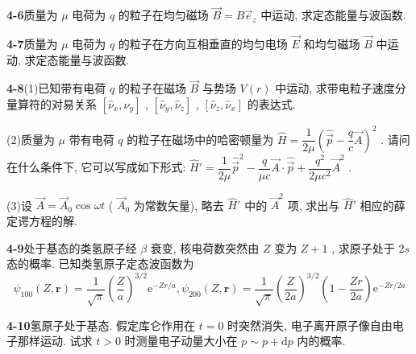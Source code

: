 \vfill

\newpage

\textbf{4-6}\quad 质量为 $\displaystyle \mu$ 电荷为 $\displaystyle q$ 的粒子在均匀磁场 $\displaystyle \vec{B} = B\vec{e}_z$ 中运动, 求定态能量与波函数.

\vfill

\newpage

\textbf{4-7}\quad 质量为 $\displaystyle \mu$ 电荷为 $\displaystyle q$ 的粒子在方向互相垂直的均匀电场 $\displaystyle \vec{E}$ 和均匀磁场 $\displaystyle \vec{B}$ 中运动, 求定态能量与波函数.

\vfill

\newpage

\textbf{4-8}\quad (1)已知带有电荷 $\displaystyle q$ 的粒子在磁场 $\displaystyle \vec{B}$ 与势场 $\displaystyle V(r)$ 中运动, 求带电粒子速度分量算符的对易关系 $\displaystyle [\hat{\nu}_x, \hat{\nu}_y]$ , $\displaystyle [\hat{\nu}_y, \hat{\nu}_z]$ , $\displaystyle [\hat{\nu}_z, \hat{\nu}_x]$ 的表达式.

(2)质量为 $\displaystyle \mu$ 带有电荷 $\displaystyle q$ 的粒子在磁场中的哈密顿量为 $\displaystyle \hat{H} = \dfrac{1}{2\mu}\left(\hat{\vec{p}} - \dfrac{q}{c} \vec{A}\right)^2$ . 请问在什么条件下, 它可以写成如下形式: $\displaystyle \hat{H}' = \dfrac{1}{2\mu}\hat{\vec{p}}^2 - \dfrac{q}{\mu c} \vec{A} \cdot \hat{\vec{p}} + \dfrac{q^2}{2\mu c^2} \vec{A}^{2}$ .

(3)设 $\displaystyle \vec{A} = \vec{A}_0 \cos \omega t$ ( $\displaystyle \vec{A}_0$ 为常数矢量), 略去 $\displaystyle \hat{H}'$ 中的 $\displaystyle \vec{A}^{2}$ 项, 求出与 $\displaystyle \hat{H}'$ 相应的薛定谔方程的解.

\vfill

\newpage

\textbf{4-9}\quad 处于基态的类氢原子经 $\displaystyle \beta$ 衰变, 核电荷数突然由 $\displaystyle Z$ 变为 $\displaystyle Z + 1$ , 求原子处于 $\displaystyle 2s$ 态的概率. 已知类氢原子定态波函数为
$$
\psi_ {1 0 0} (Z, \boldsymbol {r}) = \dfrac {1}{\sqrt {\pi}} \left(\dfrac {Z}{a}\right) ^ {3 / 2} \mathrm{e} ^ {- Z r / a}, \psi_ {2 0 0} (Z, \boldsymbol {r}) = \dfrac {1}{\sqrt {\pi}} \left(\dfrac {Z}{2 a}\right) ^ {3 / 2} \left(1 - \dfrac {Z r}{2 a}\right) \mathrm{e} ^ {- Z r / 2 a}
$$

\vfill

\newpage

\textbf{4-10}\quad 氢原子处于基态. 假定库仑作用在 $\displaystyle t = 0$ 时突然消失, 电子离开原子像自由电子那样运动. 试求 $\displaystyle t > 0$ 时测量电子动量大小在 $\displaystyle p \sim p + \mathrm{d}p$ 内的概率.


